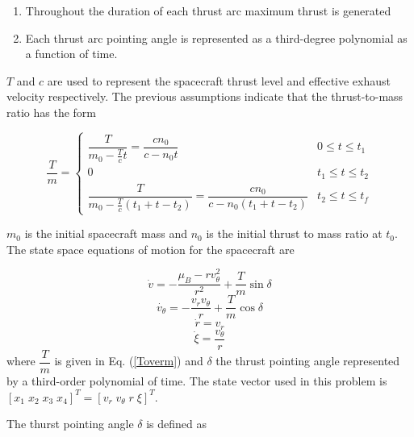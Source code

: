 \begin{enumerate}
    \item Throughout the duration of each thrust arc maximum thrust is generated
    \item Each thrust arc pointing angle is represented as a third-degree polynomial as a function of time.
\end{enumerate}

\noindent $T$ and $c$ are used to represent the spacecraft thrust level and effective exhaust velocity respectively. The previous assumptions
indicate that the thrust-to-mass ratio has the form

\begin{equation}
\dfrac{T}{m} = \begin{cases} 
    \dfrac{T}{m_0-\frac{T}{c}t} = \dfrac{cn_0}{c-n_0t} & 0\leq t \leq t_1 \\
    0 & t_1\leq t \leq t_2 \\
    \dfrac{T}{m_0-\frac{T}{c}(t_1+t-t_2)} = \dfrac{cn_0}{c-n_0(t_1+t-t_2)} & t_2\leq t \leq t_f 
  \end{cases}
  \label{Toverm}
\end{equation}

\noindent $m_0$ is the initial spacecraft mass and $n_0$ is the initial thrust to mass ratio at $t_0$.
The state space equations of motion for the spacecraft are

\begin{equation}
    \dot{v} = -\dfrac{\mu_B-rv_\theta^2}{r^2}+\dfrac{T}{m}\sin\delta
    \label{vrdot_eom}
\end{equation}
\begin{equation}
\dot{v_\theta} = -\dfrac{v_rv_\theta}{r}+\dfrac{T}{m}\cos\delta
\label{vthetadot_eom}
\end{equation}
\begin{equation}
    \dot{r} = v_r
    \label{rdot_eom}
\end{equation}
\begin{equation}
    \label{xidot_eom}
\dot{\xi} = \dfrac{v_\theta}{r}
\end{equation}
where $\dfrac{T}{m}$ is given in Eq. (\ref{Toverm}) and $\delta$ the thrust pointing angle represented by a
third-order polynomial of time. The state vector used in this problem is $[x_1 \; x_2 \; x_3 \; x_4]^T = [ v_r \; v_\theta \; r \; \xi ]^T$. \linebreak

\noindent The thurst pointing angle $\delta$ is defined as 

